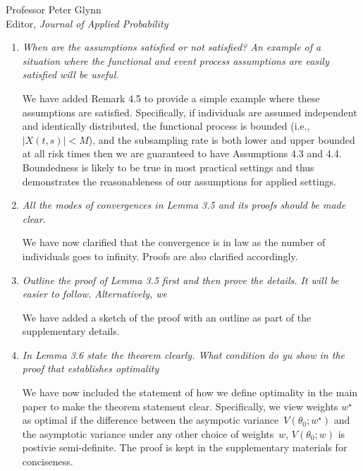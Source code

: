 \documentclass[11pt]{letter} %
\begin{document}
\begin{letter}{Professor
	Peter Glynn\\
	Editor, {\em Journal of Applied Probability}}
\begin{enumerate}
\vspace{5mm}
That is correct, we have fixed this issue.
\vspace{5mm}

\item {\it When are the assumptions satisfied or not satisfied? An example of a
situation where the functional and event process assumptions are easily satisfied will be useful.}

\vspace{5mm}
We have added Remark 4.5 to provide a simple example where these assumptions are satisfied.  Specifically, if individuals are assumed independent and identically distributed, the functional process is bounded (i.e., $|X(t,s)| < M$), and the subsampling rate is both lower and upper bounded at all risk times then we are guaranteed to have Assumptions 4.3 and 4.4. Boundedness is likely to be true in most practical settings and thus demonstrates the reasonableness of our assumptions for applied settings.
\vspace{5mm}

\item {\it All the modes of convergences in Lemma 3.5 and its proofs should be made clear.}

\vspace{5mm}
We have now clarified that the convergence is in law as the number of individuals goes to infinity.  Proofs are also clarified accordingly.
\vspace{5mm}

\item {\it Outline the proof of Lemma 3.5 first and then prove the details.  It will be easier to follow.  Alternatively, we }

\vspace{5mm}
We have added a sketch of the proof with an outline as part of the supplementary details.
\vspace{5mm}

\item {\it In Lemma 3.6 state the theorem clearly.  What condition do yu show in the proof that establishes optimality}

\vspace{5mm}
We have now included the statement of how we define optimality in the main paper to make the theorem statement clear.  Specifically, we view weights $w^\star$ as optimal if the difference between the asympotic variance~$V (\theta_0; w^\star)$ and the asymptotic variance under any other choice of weights~$w$, $V(\theta_0; w)$ is postivie semi-definite. The proof is kept in the supplementary materials for conciseness.
\vspace{5mm}


\end{enumerate}
\end{letter}
\end{document}
